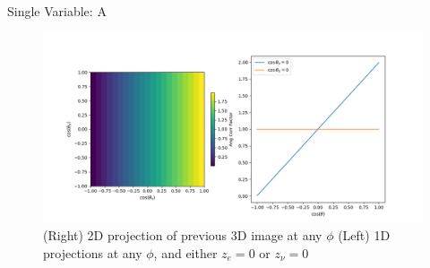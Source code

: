 \documentclass{beamer}
\begin{document}
\begin{frame}{Single Variable: A}
	\begin{figure}
		\centering
		\includegraphics[width=0.8\paperwidth]{plots/crosssections_A.png}
		\caption{(Right) 2D projection of previous 3D image at any $\phi$ (Left) 1D projections at any $\phi$, and either $z_e = 0$ or $z_\nu = 0$ }
	\end{figure}
\end{frame}
\end{document}
